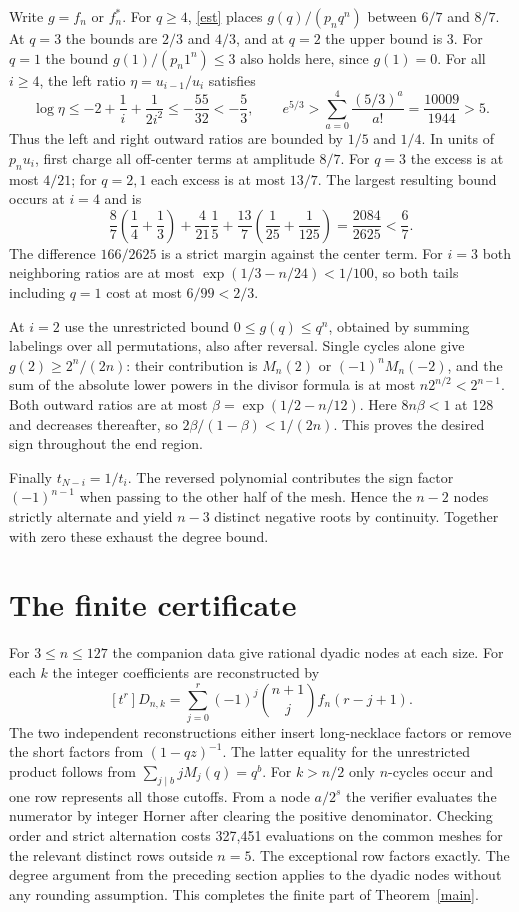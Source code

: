 \documentclass[11pt]{article}
\begin{document}
Write $g=f_n$ or $f_n^*$. For $q\ge4$, \eqref{est} places $g(q)/(p_n q^n)$ between $6/7$ and $8/7$. At $q=3$ the bounds are $2/3$ and $4/3$, and at $q=2$ the upper bound is 3. For $q=1$ the bound $g(1)/(p_n1^n)\le3$ also holds here, since $g(1)=0$.
For all $i\ge4$, the left ratio $\eta=u_{i-1}/u_i$ satisfies
\[
 \log\eta\le-2+\frac1i+\frac1{2i^2}\le-\frac{55}{32}<-\frac53,\qquad
 e^{5/3}>\sum_{a=0}^4\frac{(5/3)^a}{a!}=\frac{10009}{1944}>5.
\]
Thus the left and right outward ratios are bounded by $1/5$ and $1/4$.
In units of $p_nu_i$, first charge all off-center terms at amplitude $8/7$.
For $q=3$ the excess is at most $4/21$; for $q=2,1$ each excess is at most $13/7$.
The largest resulting bound occurs at $i=4$ and is
\begin{equation}\label{tails}
 \frac87\left(\frac14+\frac13\right)
 +\frac4{21}\frac15+\frac{13}{7}\left(\frac1{25}+\frac1{125}\right)
 =\frac{2084}{2625}<\frac67 .
\end{equation}
The difference $166/2625$ is a strict margin against the center term.
For $i=3$ both neighboring ratios are at most $\exp(1/3-n/24)<1/100$,
so both tails including $q=1$ cost at most $6/99<2/3$.

At $i=2$ use the unrestricted bound $0\le g(q)\le q^n$, obtained by summing labelings over all permutations, also after reversal. Single cycles alone give $g(2)\ge2^n/(2n)$: their contribution is $M_n(2)$ or $(-1)^nM_n(-2)$, and the sum of the absolute lower powers in the divisor formula is at most $n2^{n/2}<2^{n-1}$. Both outward ratios are at most $\beta=\exp(1/2-n/12)$. Here $8n\beta<1$ at 128 and decreases thereafter, so $2\beta/(1-\beta)<1/(2n)$. This proves the desired sign throughout the end region.

Finally $t_{N-i}=1/t_i$. The reversed polynomial contributes the sign factor $(-1)^{n-1}$ when passing to the other half of the mesh. Hence the $n-2$ nodes strictly alternate and yield $n-3$ distinct negative roots by continuity. Together with zero these exhaust the degree bound.

\section{The finite certificate}
For $3\le n\le127$ the companion data give rational dyadic nodes at each size. For each $k$ the integer coefficients are reconstructed by
\[
 [t^r]D_{n,k}=\sum_{j=0}^r(-1)^j\binom{n+1}{j} f_n(r-j+1).
\]
The two independent reconstructions either insert long-necklace factors or remove the short factors from $(1-qz)^{-1}$. The latter equality for the unrestricted product follows from $\sum_{j\mid b}jM_j(q)=q^b$. For $k>n/2$ only $n$-cycles occur and one row represents all those cutoffs. From a node $a/2^s$ the verifier evaluates the numerator by integer Horner after clearing the positive denominator. Checking order and strict alternation costs 327,451 evaluations on the common meshes for the relevant distinct rows outside $n=5$. The exceptional row factors exactly. The degree argument from the preceding section applies to the dyadic nodes without any rounding assumption. This completes the finite part of Theorem~\ref{main}.
\end{document}
